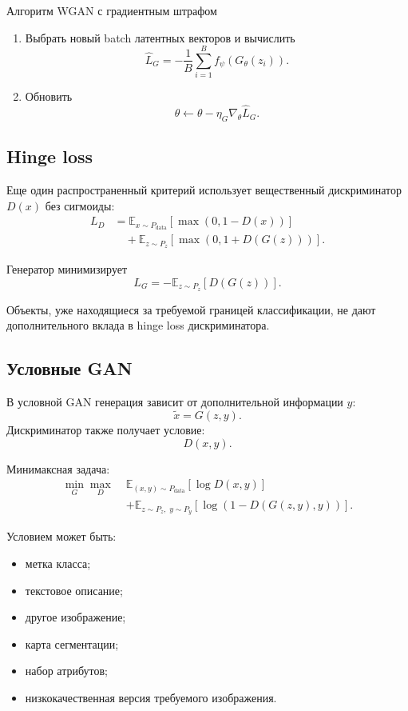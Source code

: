 \documentclass[12pt,a4paper]{article}
\newcommand{\E}{\mathbb{E}}
\numberwithin{equation}{section}
\theoremstyle{definition}
\theoremstyle{remark}
\begin{document}
\begin{algobox}{Алгоритм WGAN с градиентным штрафом}
\begin{enumerate}
    \item Выбрать новый batch латентных векторов и вычислить
    \[
        \widehat{L}_G
        =
        -\frac{1}{B}
        \sum_{i=1}^{B}
        f_\psi(G_\theta(z_i)).
    \]

    \item Обновить
    \[
        \theta
        \leftarrow
        \theta-\eta_G\nabla_\theta\widehat{L}_G.
    \]
\end{enumerate}
\end{algobox}

\subsection{Hinge loss}

Еще один распространенный критерий использует вещественный
дискриминатор \(D(x)\) без сигмоиды:
\[
\begin{split}
    L_D
    &=
    \E_{x\sim P_{\mathrm{data}}}
    [\max(0,1-D(x))]\\
    &\quad+
    \E_{z\sim P_z}
    [\max(0,1+D(G(z)))].
\end{split}
\]

Генератор минимизирует
\[
    L_G
    =
    -\E_{z\sim P_z}[D(G(z))].
\]

Объекты, уже находящиеся за требуемой границей классификации, не дают
дополнительного вклада в hinge loss дискриминатора.

\subsection{Условные GAN}

В условной GAN генерация зависит от дополнительной информации \(y\):
\[
    \widetilde{x}=G(z,y).
\]
Дискриминатор также получает условие:
\[
    D(x,y).
\]

Минимаксная задача:
\[
\begin{split}
    \min_G\max_D\;
    &
    \E_{(x,y)\sim P_{\mathrm{data}}}
    [\log D(x,y)]\\
    &+
    \E_{z\sim P_z,\;y\sim P_y}
    [\log(1-D(G(z,y),y))].
\end{split}
\]

Условием может быть:

\begin{itemize}
    \item метка класса;
    \item текстовое описание;
    \item другое изображение;
    \item карта сегментации;
    \item набор атрибутов;
    \item низкокачественная версия требуемого изображения.
\end{itemize}
\end{document}

